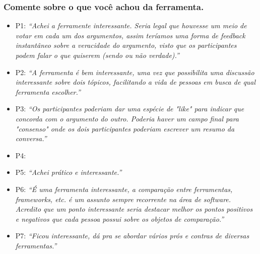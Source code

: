 \subsubsection{Comente sobre o que você achou da ferramenta.}

\begin{itemize}
  \item P1: \textit{``Achei a ferramente interessante. Seria legal que houvesse um meio de votar em cada um dos argumentos, assim teríamos uma forma de feedback instantâneo sobre a veracidade do argumento, visto que os participantes podem falar o que quiserem (sendo ou não verdade).''}
  \item P2: \textit{``A ferramenta é bem interessante, uma vez que possibilita uma discussão interessante sobre dois tópicos, facilitando a vida de pessoas em busca de qual ferramenta escolher.''}
  \item P3: \textit{``Os participantes poderiam dar uma espécie de "like" para indicar que concorda com o argumento do outro. Poderia haver um campo final para "consenso" onde os dois participantes poderiam escrever um resumo da conversa.''}
  \item P4:
  \item P5: \textit{``Achei prático e interessante.''}
  \item P6: \textit{``É uma ferramenta interessante, a comparação entre ferramentas, frameworks, etc. é um assunto sempre recorrente na área de software. Acredito que um ponto interessante seria destacar melhor os pontos positivos e negativos que cada pessoa possui sobre os objetos de comparação.''}
  \item P7: \textit{``Ficou interessante, dá pra se abordar vários prós e contras de diversas ferramentas.''}
\end{itemize}